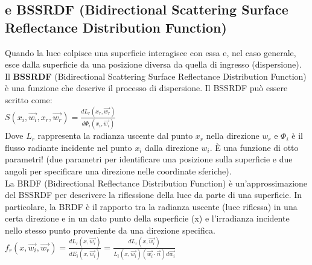 \subsection{e BSSRDF (Bidirectional Scattering Surface Reflectance Distribution Function)}
Quando la luce colpisce una superficie interagisce con essa e, nel caso generale, esce dalla superficie da una posizione diversa da quella di ingresso (dispersione).
Il \textbf{BSSRDF} (Bidirectional Scattering Surface Reflectance Distribution Function) è una funzione che descrive il processo di dispersione.
Il BSSRDF può essere scritto come: \\
$S(x_i,\vec{w_i},x_r,\vec{w_r})=\frac{dL_r(x_r,\vec{w_r})}{d\Phi_i(x_i,\vec{w_i})}$ \\
Dove $L_r$ rappresenta la radianza uscente dal punto $x_r$ nella direzione $w_r$ e $\Phi_i$ è il flusso radiante incidente nel punto $x_i$ dalla direzione $w_i$.
È una funzione di otto parametri! (due parametri per identificare una posizione sulla superficie e due angoli per specificare una direzione nelle coordinate sferiche).
\\
La BRDF (Bidirectional Reflectance Distribution Function) è un'approssimazione del BSSRDF per descrivere la riflessione della luce da parte di una superficie.
In particolare, la BRDF è il rapporto tra la radianza uscente (luce riflessa) in una certa direzione e in un dato punto della superficie (x) e l'irradianza incidente nello stesso punto proveniente da una direzione specifica.
\\
$f_r(x,\vec{w_i},\vec{w_r})=\frac{dL_r(x,\vec{w_r})}{dE_i(x,\vec{w_i})}=\frac{dL_r(x,\vec{w_r})}{L_i(x,\vec{w_i})(\vec{w_i}\cdot\vec{n} )d\vec{w_i}}$
